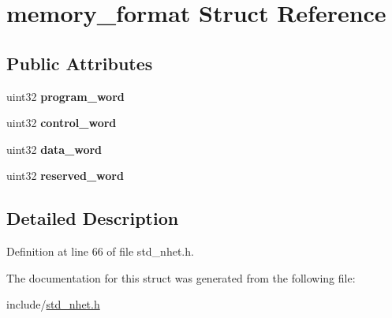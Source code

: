 \hypertarget{structmemory__format}{}\section{memory\+\_\+format Struct Reference}
\label{structmemory__format}
\subsection*{Public Attributes}
\begin{DoxyCompactItemize}
\item 
\mbox{\label{structmemory__format_a9ba015384acf9c98cbd704a8d405b621}} 
uint32 {\bfseries program\+\_\+word}
\item 
\mbox{\label{structmemory__format_a26a95ac2fa8b19caf2a28bf6a7b244d1}} 
uint32 {\bfseries control\+\_\+word}
\item 
\mbox{\label{structmemory__format_a51b712d66169133adaa492c9feb3e7c5}} 
uint32 {\bfseries data\+\_\+word}
\item 
\mbox{\label{structmemory__format_ae82a37dd7f0bbeb897d7d172021ee10f}} 
uint32 {\bfseries reserved\+\_\+word}
\end{DoxyCompactItemize}


\subsection{Detailed Description}


Definition at line 66 of file std\+\_\+nhet.\+h.



The documentation for this struct was generated from the following file\+:\begin{DoxyCompactItemize}
\item 
include/\mbox{\hyperlink{std__nhet_8h}{std\+\_\+nhet.\+h}}\end{DoxyCompactItemize}
